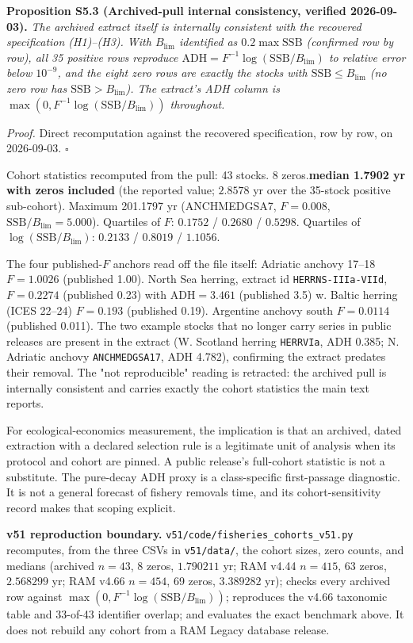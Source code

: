 \documentclass[11pt]{article}
\begin{document}
\textbf{Proposition S5.3 (Archived-pull internal consistency, verified 2026-09-03).} \emph{The archived extract itself is internally consistent with the recovered specification (H1)--(H3). With \(B_{\lim}\) identified as \(0.2\max\mathrm{SSB}\) (confirmed row by row), all 35 positive rows reproduce \(\mathrm{ADH} = F^{-1}\log(\mathrm{SSB}/B_{\lim})\) to relative error below \(10^{-9}\), and the eight zero rows are exactly the stocks with \(\mathrm{SSB} \le B_{\lim}\) (no zero row has \(\mathrm{SSB} > B_{\lim}\)). The extract's ADH column is \(\max(0, F^{-1}\log(\mathrm{SSB}/B_{\lim}))\) throughout.}

\emph{Proof.} Direct recomputation against the recovered specification, row by row, on 2026-09-03. \(\square\)

Cohort statistics recomputed from the pull: 43 stocks. 8 zeros.\textbf{median 1.7902 yr with zeros included} (the reported value; \(2.8578\) yr over the 35-stock positive sub-cohort). Maximum 201.1797 yr (ANCHMEDGSA7, \(F=0.008\), \(\mathrm{SSB}/B_{\lim}=5.000\)). Quartiles of \(F\): \(0.1752\) / \(0.2680\) / \(0.5298\). Quartiles of \(\log(\mathrm{SSB}/B_{\lim})\): \(0.2133\) / \(0.8019\) / \(1.1056\).

The four published-\(F\) anchors read off the file itself: Adriatic anchovy 17--18 \(F=1.0026\) (published 1.00). North Sea herring, extract id \texttt{HERRNS-\allowbreak{}IIIa-\allowbreak{}VIId}, \(F=0.2274\) (published 0.23) with \(\mathrm{ADH}=3.461\) (published 3.5) w. Baltic herring (ICES 22--24) \(F=0.193\) (published 0.19). Argentine anchovy south \(F=0.0114\) (published 0.011). The two example stocks that no longer carry series in public releases are present in the extract (W. Scotland herring \texttt{HERRVIa}, ADH 0.385; N. Adriatic anchovy \texttt{ANCHMEDGSA17}, ADH 4.782), confirming the extract predates their removal. The "not reproducible" reading is retracted: the archived pull is internally consistent and carries exactly the cohort statistics the main text reports.

For ecological-economics measurement, the implication is that an archived, dated extraction with a declared selection rule is a legitimate unit of analysis when its protocol and cohort are pinned. A public release's full-cohort statistic is not a substitute. The pure-decay ADH proxy is a class-specific first-passage diagnostic. It is not a general forecast of fishery removals time, and its cohort-sensitivity record makes that scoping explicit.

\textbf{v51 reproduction boundary.} \texttt{v51/code/fisheries\_cohorts\_v51.py} recomputes, from the three CSVs in \texttt{v51/data/}, the cohort sizes, zero counts, and medians (archived \(n=43\), 8 zeros, \(1.790211\) yr; RAM v4.44 \(n=415\), 63 zeros, \(2.568299\) yr; RAM v4.66 \(n=454\), 69 zeros, \(3.389282\) yr); checks every archived row against \(\max(0,F^{-1}\log(\mathrm{SSB}/B_{\lim}))\); reproduces the v4.66 taxonomic table and 33-of-43 identifier overlap; and evaluates the exact benchmark above. It does not rebuild any cohort from a RAM Legacy database release.
\end{document}
